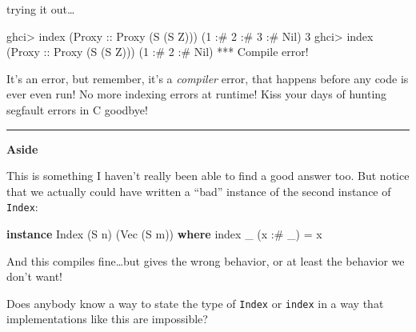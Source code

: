 \documentclass[]{article}
\newenvironment{Shaded}{}{}
\newcommand{\DataTypeTok}[1]{\textcolor[rgb]{0.56,0.13,0.00}{#1}}
\newcommand{\DecValTok}[1]{\textcolor[rgb]{0.25,0.63,0.44}{#1}}
\newcommand{\FunctionTok}[1]{\textcolor[rgb]{0.02,0.16,0.49}{#1}}
\newcommand{\KeywordTok}[1]{\textcolor[rgb]{0.00,0.44,0.13}{\textbf{#1}}}
\newcommand{\NormalTok}[1]{#1}
\newcommand{\OperatorTok}[1]{\textcolor[rgb]{0.40,0.40,0.40}{#1}}
\newcommand{\OtherTok}[1]{\textcolor[rgb]{0.00,0.44,0.13}{#1}}
\begin{document}
trying it out\ldots{}

\begin{Shaded}
\begin{Highlighting}[]
\NormalTok{ghci}\OperatorTok{\textgreater{}} \FunctionTok{index}\NormalTok{ (}\DataTypeTok{Proxy}\OtherTok{ ::} \DataTypeTok{Proxy}\NormalTok{ (}\DataTypeTok{S}\NormalTok{ (}\DataTypeTok{S} \DataTypeTok{Z}\NormalTok{))) (}\DecValTok{1} \OperatorTok{:\#} \DecValTok{2} \OperatorTok{:\#} \DecValTok{3} \OperatorTok{:\#} \DataTypeTok{Nil}\NormalTok{)}
\DecValTok{3}
\NormalTok{ghci}\OperatorTok{\textgreater{}} \FunctionTok{index}\NormalTok{ (}\DataTypeTok{Proxy}\OtherTok{ ::} \DataTypeTok{Proxy}\NormalTok{ (}\DataTypeTok{S}\NormalTok{ (}\DataTypeTok{S} \DataTypeTok{Z}\NormalTok{))) (}\DecValTok{1} \OperatorTok{:\#} \DecValTok{2} \OperatorTok{:\#} \DataTypeTok{Nil}\NormalTok{)}
\OperatorTok{***} \DataTypeTok{Compile} \FunctionTok{error}\OperatorTok{!}
\end{Highlighting}
\end{Shaded}

It's an error, but remember, it's a \emph{compiler} error, that happens before
any code is ever even run! No more indexing errors at runtime! Kiss your days of
hunting segfault errors in C goodbye!

\begin{center}\rule{0.5\linewidth}{0.5pt}\end{center}

\textbf{Aside}

This is something I haven't really been able to find a good answer too. But
notice that we actually could have written a ``bad'' instance of the second
instance of \texttt{Index}:

\begin{Shaded}
\begin{Highlighting}[]
\KeywordTok{instance} \DataTypeTok{Index}\NormalTok{ (}\DataTypeTok{S}\NormalTok{ n) (}\DataTypeTok{Vec}\NormalTok{ (}\DataTypeTok{S}\NormalTok{ m)) }\KeywordTok{where}
    \FunctionTok{index}\NormalTok{ \_ (x }\OperatorTok{:\#}\NormalTok{ \_) }\OtherTok{=}\NormalTok{ x}
\end{Highlighting}
\end{Shaded}

And this compiles fine\ldots but gives the wrong behavior, or at least the
behavior we don't want!

Does anybody know a way to state the type of \texttt{Index} or \texttt{index} in
a way that implementations like this are impossible?
\end{document}
